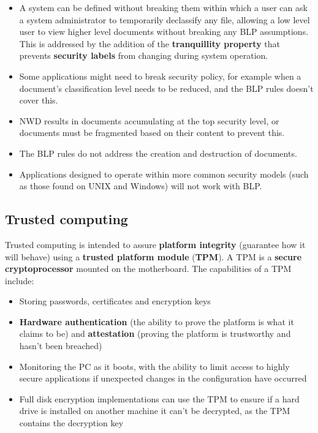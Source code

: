\documentclass[final]{article}
\begin{document}
\begin{itemize}
	\item A system can be defined without breaking them within which a user can ask a system administrator to temporarily declassify any file, allowing a low level user to view higher level documents without breaking any BLP assumptions. This is addressed by the addition of the \textbf{tranquillity property} that prevents \textbf{security labels} from changing during system operation.
	\item Some applications might need to break security policy, for example when a document's classification level needs to be reduced, and the BLP rules doesn't cover this.
	\item NWD results in documents accumulating at the top security level, or documents must be fragmented based on their content to prevent this.
	\item The BLP rules do not address the creation and destruction of documents.
	\item Applications designed to operate within more common security models (such as those found on UNIX and Windows) will not work with BLP.
\end{itemize}

\subsection{Trusted computing}
Trusted computing is intended to assure \textbf{platform integrity} (guarantee how it will behave) using a \textbf{trusted platform module} (\textbf{TPM}). A TPM is a \textbf{secure cryptoprocessor} mounted on the motherboard. The capabilities of a TPM include:
\begin{itemize}
	\item Storing passwords, certificates and encryption keys
	\item \textbf{Hardware authentication} (the ability to prove the platform is what it claims to be) and \textbf{attestation} (proving the platform is trustworthy and hasn't been breached)
	\item Monitoring the PC as it boots, with the ability to limit access to highly secure applications if unexpected changes in the configuration have occurred
	\item Full disk encryption implementations can use the TPM to ensure if a hard drive is installed on another machine it can't be decrypted, as the TPM contains the decryption key
\end{itemize}
\end{document}
